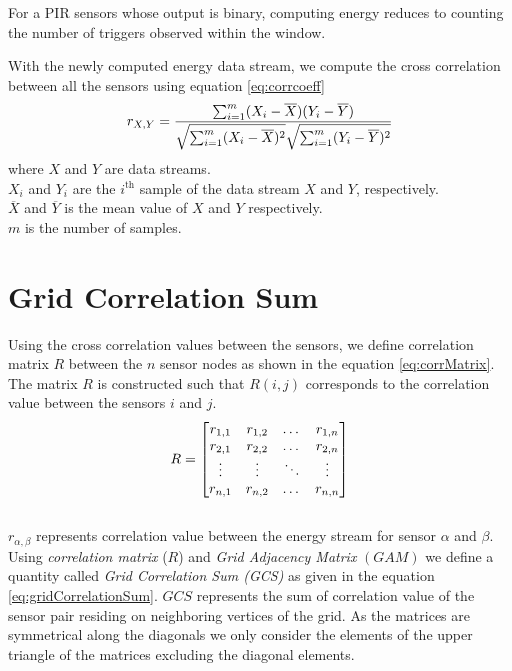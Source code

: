 For a PIR sensors whose output is binary, computing energy reduces to counting the number of triggers observed within the window.

With the newly computed energy data stream, we compute the cross correlation between all the sensors using equation \ref{eq:corrcoeff}
\begin{equation}
\label{eq:corrcoeff}
r_{X,Y}=\frac{\sum_{i=1}^{m}(X_i-\overline{X})(Y_i-\overline{Y})}{\sqrt{\sum_{i=1}^{m}(X_i-\overline{X})^2}\sqrt{\sum_{i=1}^{m}(Y_i-\overline{Y})^2}} \\
\end{equation}
where $X$ and $Y$ are data streams.\\
 $X_i$ and $Y_i$ are the $i^{\mbox{th}}$ sample of the data stream $X$ and $Y$, respectively.\\
$\overline{X}$ and $\overline{Y}$ is the mean value of $X$ and $Y$ respectively.\\
 $m$ is the number of samples.


\section{Grid Correlation Sum}
\label{sec:gcs}
Using the cross correlation values between the sensors, we define correlation matrix $R$ between the $n$ sensor nodes as shown in the equation \ref{eq:corrMatrix}. The matrix $R$ is constructed such that $R(i,j)$ corresponds to the correlation value between the sensors $i$ and $j$.
\begin{equation}
\label{eq:corrMatrix}
\centering
R = 
\begin{bmatrix}
    r_{1,1} & r_{1,2} & \dots  & r_{1,n} \\
    r_{2,1} & r_{2,2}  & \dots  & r_{2,n} \\
    \vdots & \vdots  & \ddots & \vdots \\
    r_{n,1} & r_{n,2}  & \dots  & r_{n,n}
\end{bmatrix}
\end{equation}\\
$r_{\alpha,\beta}$ represents correlation value between the energy stream for sensor $\alpha$ and $\beta$.\\


Using \textit{correlation matrix} ($R$) and \textit{Grid Adjacency Matrix} $(GAM)$ we define a quantity called \textit{Grid Correlation Sum (GCS)} as given in the equation \ref{eq:gridCorrelationSum}. $GCS$ represents the sum of correlation value of the sensor pair residing on neighboring vertices of the grid.
As the matrices are symmetrical along the diagonals we only consider the elements of the upper triangle of the matrices excluding the diagonal elements. 

